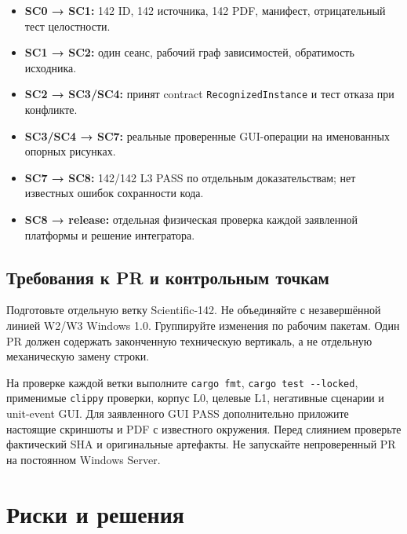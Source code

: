 \documentclass[11pt,a4paper,oneside]{scrreprt}
\providecommand{\tightlist}{\setlength{\itemsep}{0pt}\setlength{\parskip}{0pt}}
\begin{document}
\begin{itemize}
\tightlist
\item
  \textbf{SC0 → SC1:} 142 ID, 142 источника, 142 PDF, манифест, отрицательный тест целостности.
\item
  \textbf{SC1 → SC2:} один сеанс, рабочий граф зависимостей, обратимость исходника.
\item
  \textbf{SC2 → SC3/SC4:} принят contract \texttt{RecognizedInstance} и тест отказа при конфликте.
\item
  \textbf{SC3/SC4 → SC7:} реальные проверенные GUI-операции на именованных опорных рисунках.
\item
  \textbf{SC7 → SC8:} 142/142 L3 PASS по отдельным доказательствам; нет известных ошибок сохранности кода.
\item
  \textbf{SC8 → release:} отдельная физическая проверка каждой заявленной платформы и решение интегратора.
\end{itemize}

\section{Требования к PR и контрольным точкам}\label{ux442ux440ux435ux431ux43eux432ux430ux43dux438ux44f-ux43a-pr-ux438-ux43aux43eux43dux442ux440ux43eux43bux44cux43dux44bux43c-ux442ux43eux447ux43aux430ux43c}

Подготовьте отдельную ветку Scientific-142. Не объединяйте с незавершённой линией W2/W3 Windows 1.0. Группируйте изменения по рабочим пакетам. Один PR должен содержать законченную техническую вертикаль, а не отдельную механическую замену строки.

На проверке каждой ветки выполните \texttt{cargo\ fmt}, \texttt{cargo\ test\ -\/-locked}, применимые \texttt{clippy} проверки, корпус L0, целевые L1, негативные сценарии и unit-event GUI. Для заявленного GUI PASS дополнительно приложите настоящие скриншоты и PDF с известного окружения. Перед слиянием проверьте фактический SHA и оригинальные артефакты. Не запускайте непроверенный PR на постоянном Windows Server.

\chapter{Риски и решения}\label{ux440ux438ux441ux43aux438-ux438-ux440ux435ux448ux435ux43dux438ux44f}
\end{document}
